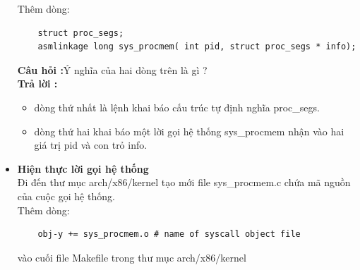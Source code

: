 \documentclass[a4paper,12pt]{article}
\begin{document}
\begin{itemize}
	Thêm dòng: 
	\begin{verbatim}
	struct proc_segs;
	asmlinkage long sys_procmem( int pid, struct proc_segs * info);
	\end{verbatim}
	\textbf{Câu hỏi :}Ý nghĩa của hai dòng trên là gì ? \\
	\textbf{Trả lời :}
	\begin{itemize}
	\item dòng thứ nhất là lệnh khai báo cấu trúc tự định nghĩa proc\_segs.
	\item dòng thứ hai khai báo một lời gọi hệ thống sys\_procmem nhận vào hai giá trị pid và con trỏ info.
	\end{itemize}
	\item \textbf{Hiện thực lời gọi hệ thống} \\
	Đi đến thư mục arch/x86/kernel tạo mới file sys\_procmem.c chứa mã nguồn của cuộc gọi hệ thống. \\
	Thêm dòng:
	\begin{verbatim}
	obj-y += sys_procmem.o # name of syscall object file
	\end{verbatim}
	vào cuối file Makefile trong thư mục arch/x86/kernel	
	\end{itemize}
\end{document}
